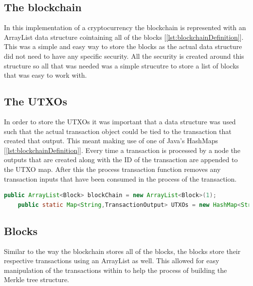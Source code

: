 \documentclass{l4proj}
\begin{document}
\subsection{The blockchain}
In this implementation of a cryptocurrency the blockchain is represented with an ArrayList data structure cointaining
all of the blocks [\ref{lst:blockchainDefinition}]. This was a simple and easy way to store the blocks as the actual data structure did not need to
have any specific security. All the security is created around this structure so all that was needed was a simple 
strucutre to store a list of blocks that was easy to work with. 



\subsection{The UTXOs}
In order to store the UTXOs it was important that a data structure was used such that the actual transaction
object could be tied to the transaction that created that output. This meant making use of one of Java's HashMaps
[\ref{lst:blockchainDefinition}]. Every time a transaction is processed by a node the outputs that are created 
along with the ID of the transaction are appended to the UTXO map. After this the process transaction function 
removes any transaction inputs that have been consumed in the process of the transaction.

\begin{lstlisting}[language=java, float, caption={This figure shows the definitions for the blockchain and also 
    the UTXO maps. The blockchain is an ArrayList created with one starting block acting as a genesis block. The 
    UTXO map is a HashMap mapping the transaction id to the transaction output created from each transaction.},
    label=lst:blockchainDefinition]
    public ArrayList<Block> blockChain = new ArrayList<Block>(1);
    public static Map<String,TransactionOutput> UTXOs = new HashMap<String,TransactionOutput>();
\end{lstlisting}

\subsection{Blocks}
Similar to the way the blockchain stores all of the blocks, the blocks store their respective transactions 
using an ArrayList as well. This allowed for easy manipulation of the transactions within to help the process of
building the Merkle tree structure.
\end{document}
